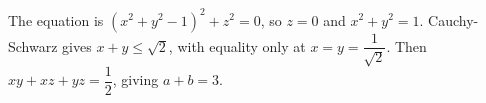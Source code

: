 The equation is $(x^2+y^2-1)^2+z^2=0$, so $z=0$ and $x^2+y^2=1$. Cauchy-Schwarz gives $x+y\le\sqrt2$, with equality only at $x=y=\dfrac{1}{\sqrt2}$. Then $xy+xz+yz=\dfrac{1}{2}$, giving $\boxed{a+b=3}$.
